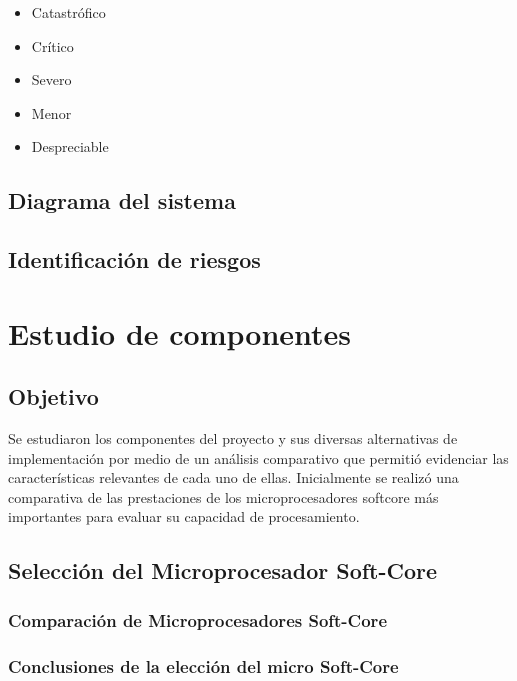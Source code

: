 		\begin{itemize}
		  \item Catastrófico
		  \item Crítico	
		  \item Severo	
		  \item Menor	
		  \item Despreciable 
		\end{itemize}
		
		
			
		\subsection{Diagrama del sistema}
			
			
		\subsection{Identificación de riesgos}
			
			
			
	\section{Estudio de componentes}
		
			\subsection{Objetivo}
			Se estudiaron los componentes del proyecto y sus diversas alternativas de implementación por medio de un análisis comparativo que permitió evidenciar
			las características relevantes de cada uno de ellas. Inicialmente se realizó una comparativa de las prestaciones de los microprocesadores softcore
			más importantes para evaluar su capacidad de procesamiento. 
			
			\subsection{Selección del Microprocesador Soft-Core}
		
				\subsubsection{Comparación de Microprocesadores Soft-Core} 
	
				\subsubsection{Conclusiones de la elección del micro Soft-Core}
					 			
